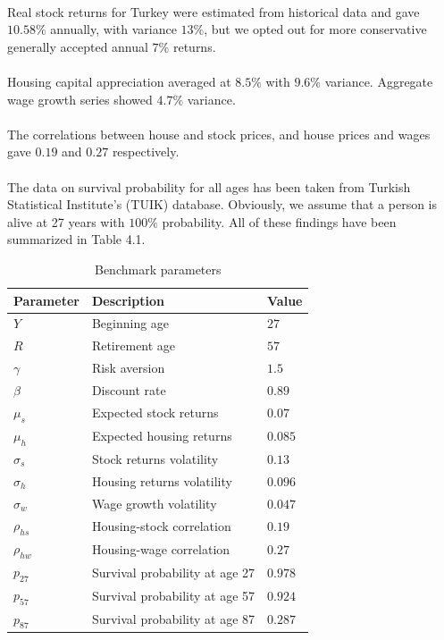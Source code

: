 \paragraph{}Real stock returns for Turkey were estimated from historical data and gave $10.58\%$ annually, with variance $13\%$, but we opted out for more conservative generally accepted annual $7\%$ returns.

\paragraph{}Housing capital appreciation averaged at $8.5\%$ with $9.6\%$ variance. Aggregate wage growth series showed $4.7\%$ variance.

\paragraph{}The correlations between house and stock prices, and house prices and wages gave $0.19$ and $0.27$ respectively.

\paragraph{}The data on survival probability for all ages has been taken from Turkish Statistical Institute's (TUIK) database. Obviously, we assume that a person is alive at 27 years with $100\%$ probability. All of these findings have been summarized in Table 4.1. 

\begin{table}
	\centering
	\begin{tabular}[c]{lll}
		\hline
		Parameter&Description&Value\\
		\hline
		$Y$&Beginning age&$27$\\
		$R$&Retirement age&$57$\\
		$\gamma$&Risk aversion&$1.5$\\
		$\beta$&Discount rate&$0.89$\\
		\hline
		$\mu_s$&Expected stock returns&$0.07$\\
		$\mu_h$&Expected housing returns&$0.085$\\
		$\sigma_s$&Stock returns volatility&$0.13$\\
		$\sigma_h$&Housing returns volatility&$0.096$\\
		$\sigma_w$&Wage growth volatility&$0.047$\\
		$\rho_{hs}$&Housing-stock correlation&$0.19$\\
		$\rho_{hw}$&Housing-wage correlation&$0.27$\\
		\hline
		$p_{27}$&Survival probability at age 27&$0.978$\\
		$p_{57}$&Survival probability at age 57&$0.924$\\
		$p_{87}$&Survival probability at age 87&$0.287$\\	
		\hline
	\end{tabular}
	\caption{Benchmark parameters}
\end{table}


